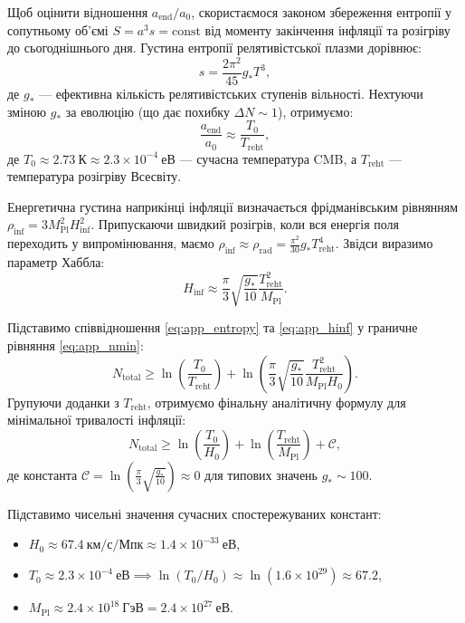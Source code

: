 Щоб оцінити відношення $a_{\mathrm{end}}/a_0$, скористаємося законом збереження ентропії у сопутньому об'ємі $S = a^3 s = \text{const}$ від моменту закінчення інфляції та розігріву до сьогоднішнього дня. Густина ентропії релятивістської плазми дорівнює:
\begin{equation}
s = \frac{2\pi^2}{45} g_* T^3,
\end{equation}
де $g_*$ --- ефективна кількість релятивістських ступенів вільності. Нехтуючи зміною $g_*$ за еволюцію (що дає похибку $\Delta N \sim 1$), отримуємо:
\begin{equation}
\label{eq:app_entropy}
\frac{a_{\mathrm{end}}}{a_0} \approx \frac{T_0}{T_{\mathrm{reht}}},
\end{equation}
де $T_0 \approx 2.73~\text{К} \approx 2.3 \times 10^{-4}~\text{еВ}$ --- сучасна температура CMB, а $T_{\mathrm{reht}}$ --- температура розігріву Всесвіту.

Енергетична густина наприкінці інфляції визначається фрідманівським рівнянням $\rho_{\mathrm{inf}} = 3 M_{\mathrm{Pl}}^2 H_{\mathrm{inf}}^2$. Припускаючи швидкий розігрів, коли вся енергія поля переходить у випромінювання, маємо $\rho_{\mathrm{inf}} \approx \rho_{\mathrm{rad}} = \frac{\pi^2}{30} g_* T_{\mathrm{reht}}^4$. Звідси виразимо параметр Хаббла:
\begin{equation}
\label{eq:app_hinf}
H_{\mathrm{inf}} \approx \frac{\pi}{3} \sqrt{\frac{g_*}{10}} \frac{T_{\mathrm{reht}}^2}{M_{\mathrm{Pl}}}.
\end{equation}

Підставимо співвідношення \eqref{eq:app_entropy} та \eqref{eq:app_hinf} у граничне рівняння \eqref{eq:app_nmin}:
\begin{equation}
N_{\mathrm{total}} \ge \ln \left( \frac{T_0}{T_{\mathrm{reht}}} \right) + \ln \left( \frac{\pi}{3} \sqrt{\frac{g_*}{10}} \frac{T_{\mathrm{reht}}^2}{M_{\mathrm{Pl}} H_0} \right).
\end{equation}
Групуючи доданки з $T_{\mathrm{reht}}$, отримуємо фінальну аналітичну формулу для мінімальної тривалості інфляції:
\begin{equation}
\label{eq:app_final_n}
N_{\mathrm{total}} \ge \ln \left( \frac{T_0}{H_0} \right) + \ln \left( \frac{T_{\mathrm{reht}}}{M_{\mathrm{Pl}}} \right) + \mathcal{C},
\end{equation}
де константа $\mathcal{C} = \ln \left( \frac{\pi}{3} \sqrt{\frac{g_*}{10}} \right) \approx 0$ для типових значень $g_* \sim 100$.

Підставимо чисельні значення сучасних спостережуваних констант:
\begin{itemize}
    \item $H_0 \approx 67.4~\text{км/с/Мпк} \approx 1.4 \times 10^{-33}~\text{еВ}$,
    \item $T_0 \approx 2.3 \times 10^{-4}~\text{еВ} \implies \ln(T_0 / H_0) \approx \ln(1.6 \times 10^{29}) \approx 67.2$,
    \item $M_{\mathrm{Pl}} \approx 2.4 \times 10^{18}~\text{ГэВ} = 2.4 \times 10^{27}~\text{еВ}$.
\end{itemize}

